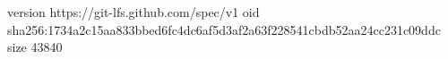 version https://git-lfs.github.com/spec/v1
oid sha256:1734a2c15aa833bbed6fc4dc6af5d3af2a63f228541cbdb52aa24cc231c09ddc
size 43840

